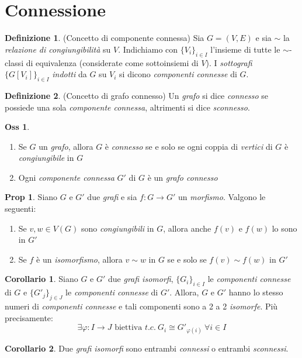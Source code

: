 \documentclass[12pt, a4paper]{report}
\theoremstyle{definition}
\newtheorem{definition}{Definizione}[section]
\newtheorem{corollary}{Corollario}[section]
\newtheorem{observation}{Oss}[section]
\newtheorem*{proposition}{Prop}
\begin{document}
\section{Connessione}

\begin{definition}(Concetto di componente connessa)
    Sia $G=(V,E)$ e sia $\sim$ la \emph{relazione di congiungibilità} su $V$. Indichiamo
    con $\{V_i\}_{i\in I}$ l'insieme di tutte le $\sim$-classi di equivalenza
    (considerate come sottoinsiemi di $V$). I \emph{sottografi} $\{G[V_i]\}_{i\in I}$
    \emph{indotti} da $G$ su $V_i$ si dicono \emph{componenti connesse} di $G$.
\end{definition}

\begin{definition}(Concetto di grafo connesso)
    Un \emph{grafo} si dice \emph{connesso} se possiede una sola \emph{componente
    connessa}, altrimenti si dice \emph{sconnesso}.
\end{definition}

\begin{observation}
    \mbox{}
    \begin{enumerate}[label=(\roman*)]
        \item Se $G$ un \emph{grafo}, allora $G$ è \emph{connesso} se e solo se
        ogni coppia di \emph{vertici} di $G$ è \emph{congiungibile} in $G$
        \item Ogni \emph{componente connessa} $G'$ di $G$ è un \emph{grafo connesso}
    \end{enumerate}
\end{observation}

\begin{proposition}
    Siano $G$ e $G'$ due \emph{grafi} e sia $f:G\to G'$ un \emph{morfismo}. Valgono
    le seguenti:
    \begin{enumerate}[label=(\roman*)]
        \item Se $v,w\in V(G)$ sono \emph{congiungibili} in $G$, allora anche $f(v)$
        e $f(w)$ lo sono in $G'$
        \item Se $f$ è un \emph{isomorfismo}, allora $v\sim w$ in $G$ se e solo se
        $f(v)\sim f(w)$ in $G'$
    \end{enumerate}
\end{proposition}

\begin{corollary}
    Siano $G$ e $G'$ due \emph{grafi isomorfi}, $\{G_i\}_{i\in I}$ le \emph{componenti
    connesse} di $G$ e $\{G'_j\}_{j\in J}$ le \emph{componenti connesse} di $G'$.
    Allora, $G$ e $G'$ hanno lo stesso numeri di \emph{componenti connesse} e tali
    componenti sono a 2 a 2 \emph{isomorfe}. Più precisamente:
    \[\exists\varphi: I\to J\text{ biettiva } t.c.\ G_i\cong G'_{\varphi(i)}\ 
    \forall i\in I\]
\end{corollary}
\begin{corollary}
    Due \emph{grafi isomorfi} sono entrambi \emph{connessi} o entrambi \emph{sconnessi}.
\end{corollary}
\end{document}
